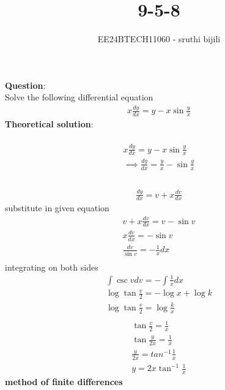 \documentclass[journal]{IEEEtran}
\begin{document}

\vspace{3cm}

\title{9-5-8}
\author{EE24BTECH11060 - sruthi bijili}
\maketitle
\bigskip

\renewcommand{\thefigure}{\theenumi}
\renewcommand{\thetable}{\theenumi}
\textbf{Question}:\\
Solve the following differential equation 
\begin{align}
x\frac{dy}{dx} = y-x\sin{\frac{y}{x}}
\end{align}
\textbf{Theoretical solution}:\\
\\
\begin{align}
    x\frac{dy}{dx}=y-x\sin{\frac{y}{x}}\\
    \implies \frac{dy}{dx}=\frac{y}{x}-\sin{\frac{y}{x}}\\
\end{align}
\\
\begin{align}
    \frac{dy}{dx}=v+x\frac{dv}{dx}
\end{align}
substitute in given equation
\begin{align}
    v+x\frac{dv}{dx}=v-\sin{v}\\
    x\frac{dv}{dx}=-\sin{v}\\
    \frac{dv}{\sin{v}}=-\frac{1}{x}dx\\
\end{align}
integrating on both sides
\begin{align}
    \int{\csc{v}}dv=-\int{\frac{1}{x}}dx\\
    \log{\tan{\frac{v}{2}}}=-\log{x}+\log{k}\\
    \log{\tan{\frac{v}{2}}}=\log{\frac{k}{x}}\\
\end{align}
\begin{align}
    \tan{\frac{v}{2}}=\frac{1}{x}\\
    \tan{\frac{y}{2x}}=\frac{1}{x}\\
    \frac{y}{2x}=tan^{-1}{\frac{1}{x}}\\
    y=2x\tan^{-1}{\frac{1}{x}}
\end{align}
\textbf{method of finite differences}\\
\end{document}
